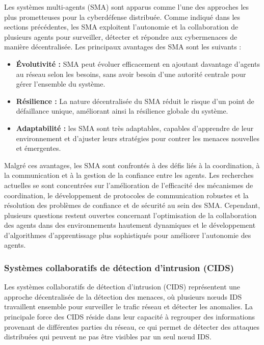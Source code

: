 Les systèmes multi-agents (SMA) sont apparus comme l'une des approches les plus prometteuses pour la cyberdéfense distribuée. Comme indiqué dans les sections précédentes, les SMA exploitent l'autonomie et la collaboration de plusieurs agents pour surveiller, détecter et répondre aux cybermenaces de manière décentralisée. Les principaux avantages des SMA sont les suivants :

\begin{itemize}
    \item \textbf{Évolutivité :} SMA peut évoluer efficacement en ajoutant davantage d'agents au réseau selon les besoins, sans avoir besoin d'une autorité centrale pour gérer l'ensemble du système.
    \item \textbf{Résilience :} La nature décentralisée du SMA réduit le risque d'un point de défaillance unique, améliorant ainsi la résilience globale du système.
    \item \textbf{Adaptabilité :} les SMA sont très adaptables, capables d’apprendre de leur environnement et d’ajuster leurs stratégies pour contrer les menaces nouvelles et émergentes.
\end{itemize}

Malgré ces avantages, les SMA sont confrontés à des défis liés à la coordination, à la communication et à la gestion de la confiance entre les agents. Les recherches actuelles se sont concentrées sur l'amélioration de l'efficacité des mécanismes de coordination, le développement de protocoles de communication robustes et la résolution des problèmes de confiance et de sécurité au sein des SMA. Cependant, plusieurs questions restent ouvertes concernant l'optimisation de la collaboration des agents dans des environnements hautement dynamiques et le développement d'algorithmes d'apprentissage plus sophistiqués pour améliorer l'autonomie des agents.

\subsubsection{Systèmes collaboratifs de détection d'intrusion (CIDS)}

Les systèmes collaboratifs de détection d'intrusion (CIDS) représentent une approche décentralisée de la détection des menaces, où plusieurs nœuds IDS travaillent ensemble pour surveiller le trafic réseau et détecter les anomalies. La principale force des CIDS réside dans leur capacité à regrouper des informations provenant de différentes parties du réseau, ce qui permet de détecter des attaques distribuées qui peuvent ne pas être visibles par un seul nœud IDS.

